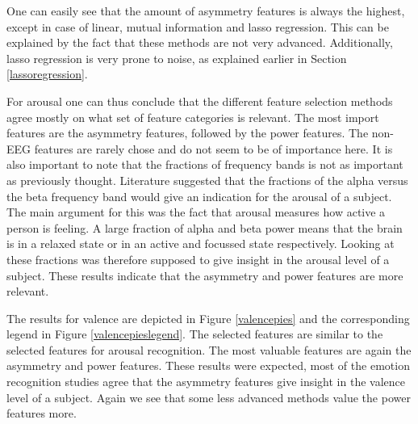 One can easily see that the amount of asymmetry features is always the highest, except in case of linear, mutual information and lasso regression. This can be explained by the fact that these methods are not very advanced. Additionally, lasso regression is very prone to noise, as explained earlier in Section \ref{lassoregression}. 

\npar

For arousal one can thus conclude that the different feature selection methods agree mostly on what set of feature categories is relevant. The most import features are the asymmetry features, followed by the power features. The non-EEG features are rarely chose and do not seem to be of importance here. It is also important to note that the fractions of frequency bands is not as important as previously thought. Literature suggested that the fractions of the alpha versus the beta frequency band would give an indication for the arousal of a subject. The main argument for this was the fact that arousal measures how active a person is feeling. A large fraction of alpha and beta power means that the brain is in a relaxed state or in an active and focussed state respectively. Looking at these fractions was therefore supposed to give insight in the arousal level of a subject. These results indicate that the asymmetry and power features are more relevant.

\npar

The results for valence are depicted in Figure \ref{valencepies} and the corresponding legend in Figure \ref{valencepieslegend}. The selected features are similar to the selected features for arousal recognition. The most valuable features are again the asymmetry and power features. These results were expected, most of the emotion recognition studies agree that the asymmetry features give insight in the valence level of a subject. Again we see that some less advanced methods value the power features more.

